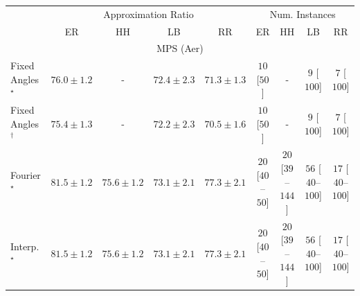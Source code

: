 \begin{tabular}{l|cccc|cccc|}
\toprule
& \multicolumn{4}{c|}{Approximation Ratio} & \multicolumn{4}{c|}{Num. Instances} \\
            & ER & HH & LB & RR & ER & HH & LB & RR \\
\midrule
\multicolumn{9}{c}{\rule{0pt}{8pt}MPS (Aer)} \\
\midrule
Fixed Angles$^\star$ & {\cellcolor[HTML]{88449E}} \color[HTML]{F1F1F1} $76.0\pm 1.2$ & {\cellcolor[HTML]{000000}} \color[HTML]{F1F1F1} {\cellcolor{white}} \color{black} - & {\cellcolor[HTML]{8C79B8}} \color[HTML]{F1F1F1} $72.4\pm 2.3$ & {\cellcolor[HTML]{8C8BC0}} \color[HTML]{F1F1F1} $71.3\pm 1.3$ & {\cellcolor[HTML]{FFF7F3}} \color[HTML]{000000} $10$ [$50$] & {\cellcolor[HTML]{000000}} \color[HTML]{F1F1F1} {\cellcolor{white}} \color{black} - & {\cellcolor[HTML]{FFF7F3}} \color[HTML]{000000} $9$ [$100$] & {\cellcolor[HTML]{FFF7F3}} \color[HTML]{000000} $7$ [$100$] \\
Fixed Angles$^\dagger$ & {\cellcolor[HTML]{894DA3}} \color[HTML]{F1F1F1} $75.4\pm 1.3$ & {\cellcolor[HTML]{000000}} \color[HTML]{F1F1F1} {\cellcolor{white}} \color{black} - & {\cellcolor[HTML]{8C7DBA}} \color[HTML]{F1F1F1} $72.2\pm 2.3$ & {\cellcolor[HTML]{8C95C6}} \color[HTML]{F1F1F1} $70.5\pm 1.6$ & {\cellcolor[HTML]{FFF7F3}} \color[HTML]{000000} $10$ [$50$] & {\cellcolor[HTML]{000000}} \color[HTML]{F1F1F1} {\cellcolor{white}} \color{black} - & {\cellcolor[HTML]{FFF7F3}} \color[HTML]{000000} $9$ [$100$] & {\cellcolor[HTML]{FFF7F3}} \color[HTML]{000000} $7$ [$100$] \\
Fourier$^\star$ & {\cellcolor[HTML]{550253}} \color[HTML]{F1F1F1} $81.5\pm 1.2$ & {\cellcolor[HTML]{894BA2}} \color[HTML]{F1F1F1} $75.6\pm 1.2$ & {\cellcolor[HTML]{8C70B3}} \color[HTML]{F1F1F1} $73.1\pm 2.1$ & {\cellcolor[HTML]{852F91}} \color[HTML]{F1F1F1} $77.3\pm 2.1$ & {\cellcolor[HTML]{FFF4F0}} \color[HTML]{000000} $20$ [$40$--$50$] & {\cellcolor[HTML]{FFF4F0}} \color[HTML]{000000} $20$ [$39$--$144$] & {\cellcolor[HTML]{FEECE9}} \color[HTML]{000000} $56$ [$40$--$100$] & {\cellcolor[HTML]{FFF5F1}} \color[HTML]{000000} $17$ [$40$--$100$] \\
Interp.$^\star$ & {\cellcolor[HTML]{550253}} \color[HTML]{F1F1F1} $81.5\pm 1.2$ & {\cellcolor[HTML]{894BA2}} \color[HTML]{F1F1F1} $75.6\pm 1.2$ & {\cellcolor[HTML]{8C70B3}} \color[HTML]{F1F1F1} $73.1\pm 2.1$ & {\cellcolor[HTML]{852F91}} \color[HTML]{F1F1F1} $77.3\pm 2.1$ & {\cellcolor[HTML]{FFF4F0}} \color[HTML]{000000} $20$ [$40$--$50$] & {\cellcolor[HTML]{FFF4F0}} \color[HTML]{000000} $20$ [$39$--$144$] & {\cellcolor[HTML]{FEECE9}} \color[HTML]{000000} $56$ [$40$--$100$] & {\cellcolor[HTML]{FFF5F1}} \color[HTML]{000000} $17$ [$40$--$100$] \\

\end{tabular}
